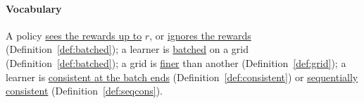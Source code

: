 \documentclass[11pt]{article}
\newcommand{\term}[2]{\hyperlink{#1}{#2}}
\newcommand{\1}{\mathbf{1}}
\newcommand{\sees}{\term{t:sees}{sees the rewards up to}}
\newcommand{\ignores}{\term{t:sees}{ignores the rewards}}
\newcommand{\batched}{\term{t:batched}{batched}}
\newcommand{\consistent}{\term{t:cons}{consistent at the batch ends}}
\newcommand{\seqcons}{\term{t:seqc}{sequentially consistent}}
\newcommand{\finer}{\term{t:finer}{finer}}
\begin{document}
\paragraph{Vocabulary} A policy \sees{} $r$, or \ignores{} (Definition~\ref{def:batched}); a learner
is \batched{} on a grid (Definition~\ref{def:batched}); a grid is \finer{} than another
(Definition~\ref{def:grid}); a learner is \consistent{} (Definition~\ref{def:consistent}) or
\seqcons{} (Definition~\ref{def:seqcons}).



\end{document}
